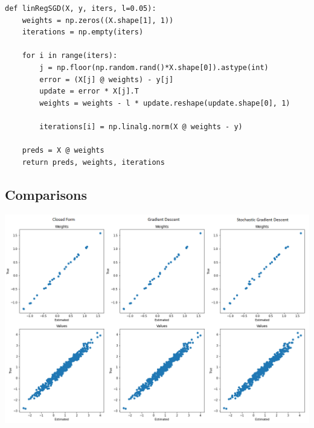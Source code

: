 \documentclass[sigconf]{acmart}
\begin{document}
\begin{listing}[H]
    \begin{verbatim}
def linRegSGD(X, y, iters, l=0.05):
    weights = np.zeros((X.shape[1], 1))
    iterations = np.empty(iters)
    
    for i in range(iters):  
        j = np.floor(np.random.rand()*X.shape[0]).astype(int)
        error = (X[j] @ weights) - y[j]
        update = error * X[j].T
        weights = weights - l * update.reshape(update.shape[0], 1)
      
        iterations[i] = np.linalg.norm(X @ weights - y)
        
    preds = X @ weights
    return preds, weights, iterations
    \end{verbatim}
\end{listing}

\subsection{Comparisons}
\begin{center}
    \includegraphics[width=\linewidth]{figs/LinRegComparison.png}
\end{center}
\end{document}
